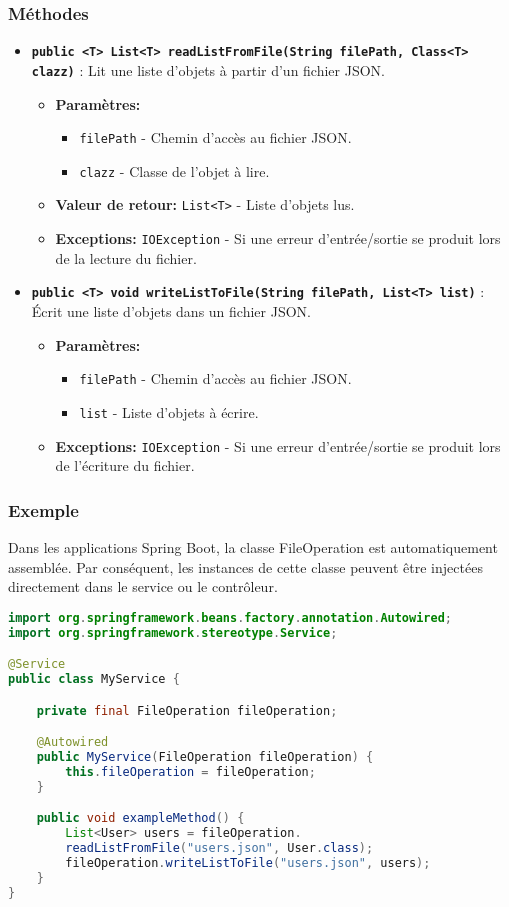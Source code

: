 \documentclass{article}
\begin{document}
\subsubsection{Méthodes}
\begin{itemize}
  \item \textbf{\texttt{public <T> List<T> readListFromFile(String filePath, Class<T> clazz)} }: Lit une liste d'objets à partir d'un fichier JSON.
  \begin{itemize}
    \item \textbf{Paramètres:}
    \begin{itemize}
      \item \texttt{filePath} - Chemin d'accès au fichier JSON.
      \item \texttt{clazz} - Classe de l'objet à lire.
    \end{itemize}
    \item \textbf{Valeur de retour:} \texttt{List<T>} - Liste d'objets lus.
    \item \textbf{Exceptions:} \texttt{IOException} - Si une erreur d'entrée/sortie se produit lors de la lecture du fichier.
  \end{itemize}
  \item \textbf{\texttt{public <T> void writeListToFile(String filePath, List<T> list)} }: Écrit une liste d'objets dans un fichier JSON.
  \begin{itemize}
    \item \textbf{Paramètres:}
    \begin{itemize}
      \item \texttt{filePath} - Chemin d'accès au fichier JSON.
      \item \texttt{list} - Liste d'objets à écrire.
    \end{itemize}
    \item \textbf{Exceptions:} \texttt{IOException} - Si une erreur d'entrée/sortie se produit lors de l'écriture du fichier.
  \end{itemize}
\end{itemize}
\subsubsection{Exemple}
Dans les applications Spring Boot, la classe FileOperation est automatiquement assemblée. Par conséquent, les instances de cette classe peuvent être injectées directement dans le service ou le contrôleur.
\begin{lstlisting}[language=Java]
import org.springframework.beans.factory.annotation.Autowired;
import org.springframework.stereotype.Service;

@Service
public class MyService {

    private final FileOperation fileOperation;

    @Autowired
    public MyService(FileOperation fileOperation) {
        this.fileOperation = fileOperation;
    }

    public void exampleMethod() {
        List<User> users = fileOperation.
        readListFromFile("users.json", User.class);
        fileOperation.writeListToFile("users.json", users);
    }
}

\end{lstlisting}
\end{document}
